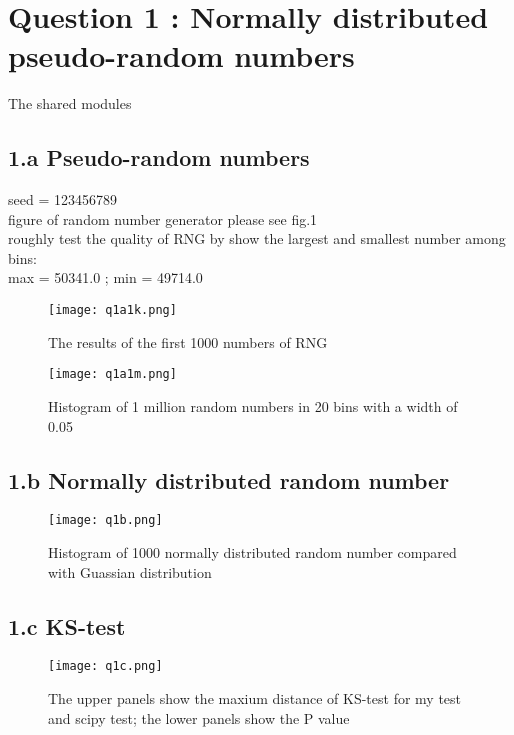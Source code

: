 \section{Question 1 : Normally distributed pseudo-random numbers}
The shared modules


\subsection{1.a  Pseudo-random numbers}


seed =  123456789\\
figure of random number generator please see fig.1 \\
roughly test the quality of RNG by show the largest and smallest number among bins:\\
max =  50341.0 ; min =  49714.0\\

\begin{figure}[h!]
  \centering
  \texttt{[image: q1a1k.png]}
  \caption{The results of the first 1000 numbers of RNG }
  \label{fig:n1k}
\end{figure}

\begin{figure}[h!]
  \centering
  \texttt{[image: q1a1m.png]}
  \caption{Histogram of 1 million random numbers in 20 bins with a width of 0.05}
  \label{fig:n1m}
\end{figure}


\subsection{1.b Normally distributed random number}


\begin{figure}[h!]
  \centering
  \texttt{[image: q1b.png]}
  \caption{Histogram of 1000 normally distributed random number compared with Guassian distribution}
  \label{fig:normal_random}
\end{figure}


\subsection{1.c KS-test}


\begin{figure}[h!]
  \centering
  \texttt{[image: q1c.png]}
  \caption{The upper panels show the maxium distance of KS-test for my test and scipy test; 
  the lower panels show the P value}
  \label{fig:ks_test}
\end{figure}

